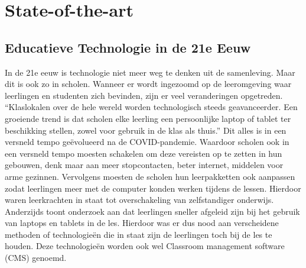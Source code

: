 \section{State-of-the-art}%
\label{sec:state-of-the-art}
\subsection{Educatieve Technologie in de 21e Eeuw}
In de 21e eeuw is technologie niet meer weg te denken uit de samenleving. Maar dit is ook zo in scholen. Wanneer er wordt ingezoomd op de leeromgeving waar leerlingen en studenten zich bevinden, zijn er veel veranderingen opgetreden. ``Klaslokalen over de hele wereld worden technologisch steeds geavanceerder. Een groeiende trend is dat scholen elke leerling een persoonlijke laptop of tablet ter beschikking stellen, zowel voor gebruik in de klas als thuis.'' \textcite{HALL2021101957} Dit alles is in een versneld tempo geëvolueerd na de COVID-pandemie. Waardoor scholen ook in een versneld tempo moesten schakelen om deze vereisten op te zetten in hun gebouwen, denk maar aan meer stopcontacten, beter internet, middelen voor arme gezinnen.\newline
Vervolgens moesten de scholen hun leerpakketten ook aanpassen zodat leerlingen meer met de computer konden werken tijdens de lessen. Hierdoor waren leerkrachten in staat tot overschakeling van zelfstandiger onderwijs. Anderzijds toont onderzoek aan dat leerlingen sneller afgeleid zijn bij het gebruik van laptops en tablets in de les. \textcite{deng2020laptops} Hierdoor was er dus nood aan verscheidene methoden of technologieën die in staat zijn de leerlingen toch bij de les te houden. Deze technologieën worden ook wel Classroom management software (CMS) genoemd.

